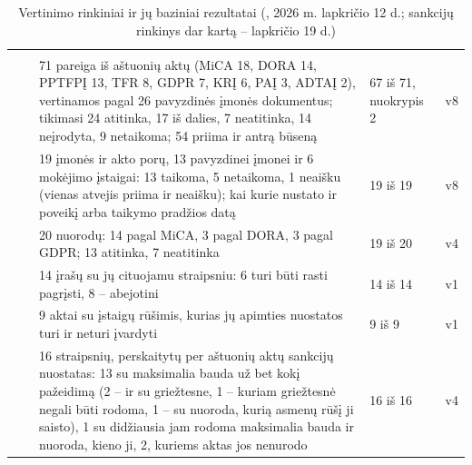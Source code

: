 \begin{xltabular}{\textwidth}{@{}L{20mm}L{32mm}YR{16mm}L{24mm}@{}}
\caption{Vertinimo rinkiniai ir jų baziniai rezultatai (, 2026 m. lapkričio 12 d.; sankcijų rinkinys dar kartą -- lapkričio 19 d.)}\label{tab:control:suites}\\
\toprule
{} &  &  &  &  \\
\midrule
\endfirsthead
\toprule
{} &  &  &  &  \\
\midrule
\endhead
\bottomrule
\endlastfoot
{} &  & 71 pareiga iš aštuonių aktų (MiCA 18, DORA 14, PPTFPĮ 13, TFR 8, GDPR 7, KRĮ 6, PAĮ 3, ADTAĮ 2), vertinamos pagal 26 pavyzdinės įmonės dokumentus; tikimasi 24 atitinka, 17 iš dalies, 7 neatitinka, 14 neįrodyta, 9 netaikoma; 54 priima ir antrą būseną & 67 iš 71, nuokrypis 2 & v8 \\
 &  & 19 įmonės ir akto porų, 13 pavyzdinei įmonei ir 6 mokėjimo įstaigai: 13 taikoma, 5 netaikoma, 1 neaišku (vienas atvejis priima ir neaišku); kai kurie nustato ir poveikį arba taikymo pradžios datą & 19 iš 19 & v8 \\
 &  & 20 nuorodų: 14 pagal MiCA, 3 pagal DORA, 3 pagal GDPR; 13 atitinka, 7 neatitinka & 19 iš 20 & v4 \\
 &  & 14 įrašų su jų cituojamu straipsniu: 6 turi būti rasti pagrįsti, 8 -- abejotini & 14 iš 14 & v1 \\
 &  & 9 aktai su įstaigų rūšimis, kurias jų apimties nuostatos turi ir neturi įvardyti & 9 iš 9 & v1 \\
 &  & 16 straipsnių, perskaitytų per aštuonių aktų sankcijų nuostatas: 13 su maksimalia bauda už bet kokį pažeidimą (2 -- ir su griežtesne, 1 -- kuriam griežtesnė negali būti rodoma, 1 -- su nuoroda, kurią asmenų rūšį ji saisto), 1 su didžiausia jam rodoma maksimalia bauda ir nuoroda, kieno ji, 2, kuriems aktas jos nenurodo & 16 iš 16 & v4 \\
\end{xltabular}

